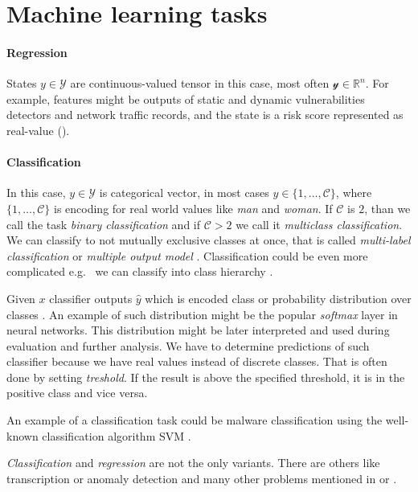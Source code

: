 \section{Machine learning tasks}
\paragraph{Regression}
States $y \in \mathcal{Y}$ are continuous-valued tensor in this case, most often $\mathcal{y} \in \mathbb{R}^{n}$. For example, features might be outputs of static and dynamic vulnerabilities detectors and network traffic records, and the state is a risk score represented as real-value (\cite{Jaganathan2015}).

\paragraph{Classification}
In this case, $y \in \mathcal{Y}$ is categorical vector, in most cases $y \in \{1,\dots,\mathcal{C}\}$, where $\{1,\dots,\mathcal{C}\}$ is encoding for real world values like \emph{man} and \emph{woman}. If $\mathcal{C}$ is $2$, than we call the task \emph{binary classification} and if $\mathcal{C}>2$ we call it \emph{multiclass classification}. We can classify to not mutually exclusive classes at once, that is called \emph{multi-label classification} or \emph{multiple output model} \cite{murphy2013machine}. Classification could be even more complicated e.g. \ we can classify into class hierarchy \cite{zhang2020dive}.

Given $x$ classifier outputs $\hat{y}$ which is encoded class or probability distribution over classes \cite{GoodBengCour16}. An example of such distribution might be the popular \emph{softmax} layer in neural networks. This distribution might be later interpreted and used during evaluation and further analysis. We have to determine predictions of such classifier because we have real values instead of discrete classes. That is often done by setting \emph{treshold}. If the result is above the specified threshold, it is in the positive class and vice versa.

An example of a classification task could be malware classification using the well-known classification algorithm SVM \cite{Kruczkowski2014}.

\emph{Classification} and \emph{regression} are not the only variants. There are others like transcription \cite{GoodBengCour16} or anomaly detection \cite{Chandola2009} and many other problems mentioned in \cite{GoodBengCour16} or \cite{zhang2020dive}. 

